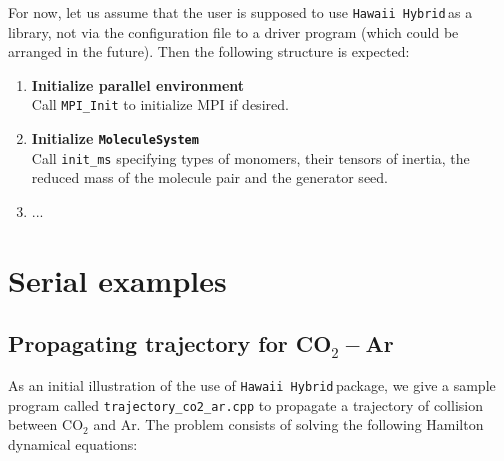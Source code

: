 \documentclass{article}
\newcommand{\libname}{\texttt{Hawaii Hybrid}\,}
\begin{document}
For now, let us assume that the user is supposed to use \libname as a library, not via the configuration file to a driver program (which could be arranged in the future). Then the following structure is expected:

\begin{enumerate}

\item \textbf{Initialize parallel environment} \\
Call \texttt{MPI\_Init} to initialize MPI if desired.

\item \textbf{Initialize \texttt{MoleculeSystem}} \\
Call \texttt{init\_ms} specifying types of monomers, their tensors of inertia, the reduced mass of the molecule pair and the generator seed.

\item ...

\end{enumerate}


\section{Serial examples}
\label{sec:serial-examples}

\subsection{Propagating trajectory for CO$_2-$Ar}
\label{subsec:example-trajectory}

As an initial illustration of the use of \libname package, we give a sample program called \texttt{trajectory\_co2\_ar.cpp} to propagate a trajectory of collision between CO$_2$ and Ar. The problem consists of solving the following Hamilton dynamical equations:
\end{document}
